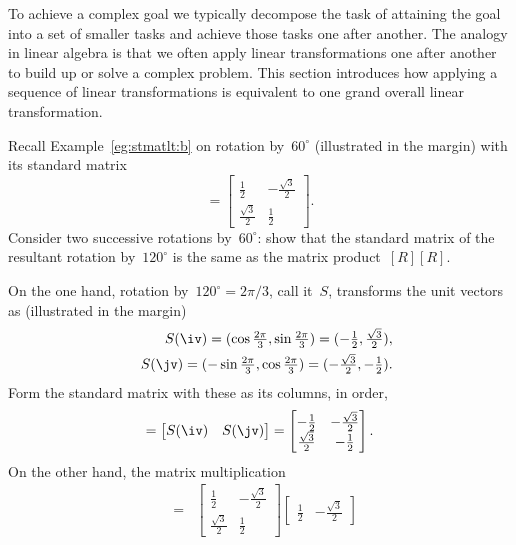 To achieve a complex goal we typically decompose the task of attaining the goal into a set of smaller tasks and achieve those tasks one after another.
The analogy in linear algebra is that we often apply linear transformations one after another to build up or solve a complex problem.
This section introduces how applying a sequence of linear transformations is equivalent to one grand overall linear transformation.

\begin{example} 
Recall Example~\ref{eg:stmatlt:b} on rotation by~\(60^\circ\) (illustrated in the margin) with its standard matrix
%
\begin{equation*}
[R]=\begin{bmatrix} \frac12&-\frac{\sqrt3}2
\\\frac{\sqrt3}2&\frac12 \end{bmatrix}.
\end{equation*}
Consider two successive rotations by~\(60^\circ\): show that the standard matrix of the resultant rotation by~\(120^\circ\)  is the same as the matrix product~\([R][R]\).
\begin{solution} 
On the one hand, rotation by~\(120^\circ=2\pi/3\), call it~\(S\), transforms the unit vectors as (illustrated in the margin)
%
\begin{eqnarray*}
&&S(\iv)=(\cos\tfrac{2\pi}3,\sin\tfrac{2\pi}3)
=(-\tfrac12,\tfrac{\sqrt3}2),
\\&&S(\jv)=(-\sin\tfrac{2\pi}3,\cos\tfrac{2\pi}3)
=(-\tfrac{\sqrt3}2,-\tfrac12).
\end{eqnarray*}
Form the standard matrix with these as its columns, in order,
\begin{equation*}
[S]=\begin{bmatrix} S(\iv)&S(\jv) \end{bmatrix}
=\begin{bmatrix} -\frac12&-\frac{\sqrt3}2
\\\frac{\sqrt3}2&-\frac12 \end{bmatrix}.
\end{equation*}
On the other hand, the matrix multiplication
\begin{eqnarray*}
[R][R]
&=&\begin{bmatrix} \frac12&-\frac{\sqrt3}2
\\\frac{\sqrt3}2&\frac12 \end{bmatrix}\begin{bmatrix} \frac12&-\frac{\sqrt3}2

\end{bmatrix}
\end{eqnarray*}
\end{solution}
\end{example}
